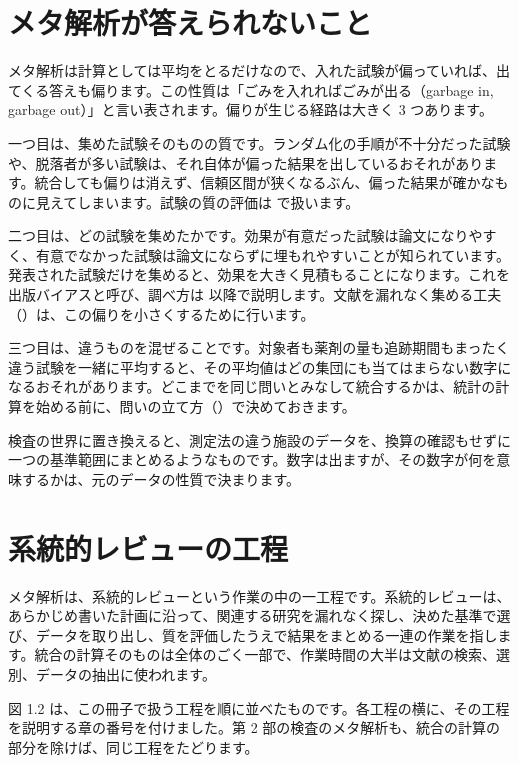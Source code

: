 \section{メタ解析が答えられないこと}
\label{sec:01-4}

メタ解析は計算としては平均をとるだけなので、入れた試験が偏っていれば、出てくる答えも偏ります。この性質は「ごみを入れればごみが出る（garbage in, garbage out）」と言い表されます。偏りが生じる経路は大きく 3 つあります。

一つ目は、集めた試験そのものの質です。ランダム化の手順が不十分だった試験や、脱落者が多い試験は、それ自体が偏った結果を出しているおそれがあります。統合しても偏りは消えず、信頼区間が狭くなるぶん、偏った結果が確かなものに見えてしまいます。試験の質の評価は  で扱います。

二つ目は、どの試験を集めたかです。効果が有意だった試験は論文になりやすく、有意でなかった試験は論文にならずに埋もれやすいことが知られています。発表された試験だけを集めると、効果を大きく見積もることになります。これを出版バイアスと呼び、調べ方は  以降で説明します。文献を漏れなく集める工夫（）は、この偏りを小さくするために行います。

三つ目は、違うものを混ぜることです。対象者も薬剤の量も追跡期間もまったく違う試験を一緒に平均すると、その平均値はどの集団にも当てはまらない数字になるおそれがあります。どこまでを同じ問いとみなして統合するかは、統計の計算を始める前に、問いの立て方（）で決めておきます。

検査の世界に置き換えると、測定法の違う施設のデータを、換算の確認もせずに一つの基準範囲にまとめるようなものです。数字は出ますが、その数字が何を意味するかは、元のデータの性質で決まります。

\section{系統的レビューの工程}
\label{sec:01-5}

メタ解析は、系統的レビューという作業の中の一工程です。系統的レビューは、あらかじめ書いた計画に沿って、関連する研究を漏れなく探し、決めた基準で選び、データを取り出し、質を評価したうえで結果をまとめる一連の作業を指します。統合の計算そのものは全体のごく一部で、作業時間の大半は文献の検索、選別、データの抽出に使われます。

図 1.2 は、この冊子で扱う工程を順に並べたものです。各工程の横に、その工程を説明する章の番号を付けました。第 2 部の検査のメタ解析も、統合の計算の部分を除けば、同じ工程をたどります。

